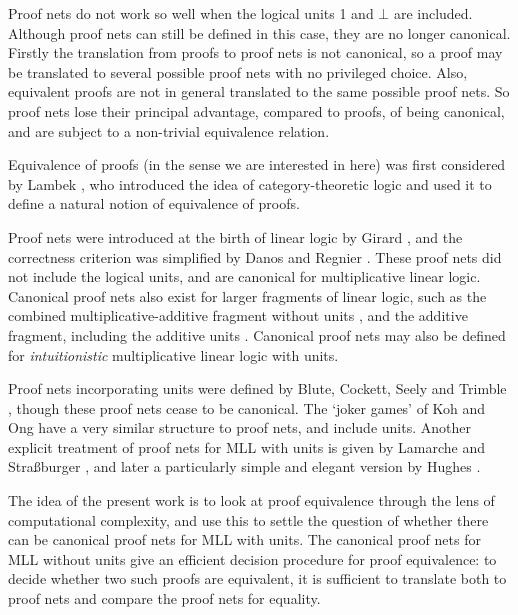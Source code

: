 \documentclass{lmcs}
\let\capsabbrev=\uppercase
\begin{document}
Proof nets do not work so well when the logical units 1 and $\bot$ are included. Although
proof nets can still be defined in this case, they are no longer canonical. Firstly the
translation from proofs to proof nets is not canonical, so a proof may be translated
to several possible proof nets with no privileged choice. Also, equivalent proofs are not
in general translated to the same possible proof nets. So proof nets lose their principal
advantage, compared to proofs, of being canonical, and are subject to a non-trivial
equivalence relation.

Equivalence of proofs (in the sense we are interested in here) was first considered
by Lambek \cite{Lambek-1968}, who introduced the idea of category-theoretic logic and used
it to define a natural notion of equivalence of proofs.

Proof nets were introduced at the birth of linear logic by Girard \cite{Girard-1987}, and
the correctness criterion was simplified by Danos and Regnier \cite{Danos-Regnier-1989}.
These proof nets did not include the logical units, and are canonical for multiplicative linear logic.
%
Canonical proof nets also exist for larger fragments of linear logic, such as the combined multiplicative-additive fragment without units \cite{Hughes-vanGlabbeek-2005}, and the additive fragment, including the additive units \cite{Heijltjes-2011}. Canonical proof nets may also be defined for \emph{intuitionistic} multiplicative linear logic with units.

Proof nets incorporating units were defined by Blute, Cockett, Seely and Trimble \cite{Trimble-1994,Blute-Cockett-Seely-Trimble-1996}, though these proof nets cease to be canonical. The `joker games' of Koh and Ong \cite{Koh-Ong-1999} have a very similar structure to proof nets, and include units. Another explicit treatment of proof nets for \capsabbrev{mll} with units is given by Lamarche and Stra\ss burger \cite{Lamarche-Strassburger-2006}, and later a particularly simple and elegant version by Hughes \cite{Hughes-2012-categories,Hughes-2012-nets}.

The idea of the present work is to look at proof equivalence through the lens of computational
complexity, and use this to settle the question of whether there can be canonical proof nets
for \capsabbrev{mll} with units. The canonical proof nets for \capsabbrev{mll} without units
give an efficient decision procedure for proof equivalence: to decide whether two such proofs
are equivalent, it is sufficient to translate both to proof nets and compare the proof nets
for equality.
\end{document}
